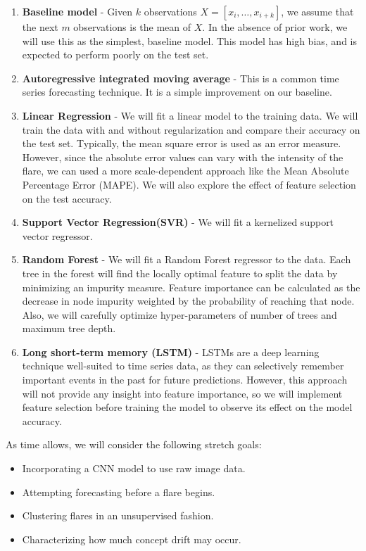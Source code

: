\documentclass[letterpaper, 10 pt, onecolumn]{ieeeconf}
\begin{document}
\begin{enumerate}
    \item \textbf{Baseline model} - Given $k$ observations $X = [x_i, \hdots , x_{i+k}]$, we assume that the next $m$ observations is the mean of $X$. In the absence of prior work, we will use this as the simplest, baseline model. This model has high bias, and is expected to perform poorly on the test set. 
    \item \textbf{Autoregressive integrated moving average} - This is a common time series forecasting technique. It is a simple improvement on our baseline. 
    \item \textbf{Linear Regression} - We will fit a linear model to the training data. We will train the data with and without regularization and compare their accuracy on the test set. Typically, the mean square error is used as an error measure. However, since the absolute error values can vary with the intensity of the flare, we can used a more scale-dependent approach like the Mean Absolute Percentage Error (MAPE). We will also explore the effect of feature selection on the test accuracy.
    \item \textbf{Support Vector Regression(SVR)} - We will fit a kernelized support vector regressor. 
    \item \textbf{Random Forest} - We will fit a Random Forest regressor to the data. Each tree in the forest will find the locally optimal feature to split the data by minimizing an impurity measure. Feature importance can be calculated as the decrease in node impurity weighted by the probability of reaching that node. Also, we will carefully optimize hyper-parameters of number of trees and maximum tree depth. 
    \item \textbf{Long short-term memory (LSTM)} - LSTMs are a deep learning technique well-suited to time series data, as they can selectively remember important events in the past for future predictions. However, this approach will not provide any insight into feature importance, so we will implement feature selection before training the model to observe its effect on the model accuracy.
\end{enumerate}

As time allows, we will consider the following stretch goals:
\begin{itemize}
    \item Incorporating a CNN model to use raw image data.
    \item Attempting forecasting before a flare begins.
    \item Clustering flares in an unsupervised fashion.
    \item Characterizing how much concept drift may occur.
\end{itemize}
\end{document}
